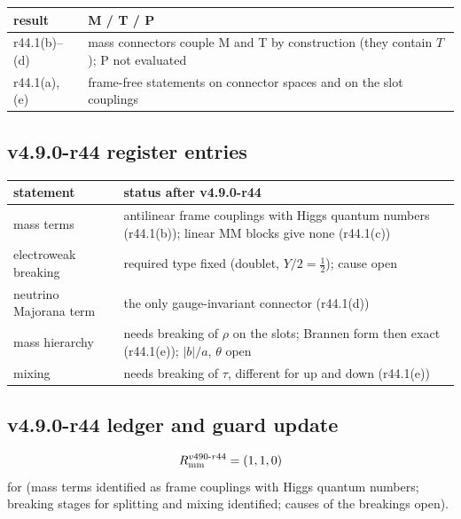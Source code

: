 \begin{center}
\small
\begin{tabular}{@{}>{\raggedright\arraybackslash}p{}>{\raggedright\arraybackslash}p{}@{}}
\toprule
result & M / T / P\\
\midrule
r44.1(b)--(d) & mass connectors couple M and T by construction (they contain \(T\)); P not evaluated\\
r44.1(a), (e) & frame-free statements on connector spaces and on the slot couplings\\
\bottomrule
\end{tabular}
\end{center}

\subsection*{v4.9.0-r44 register entries}
\label{subsec:v490-r44-register}

\begin{center}
\small
\begin{tabular}{@{}>{\raggedright\arraybackslash}p{}>{\raggedright\arraybackslash}p{}@{}}
\toprule
statement & status after v4.9.0-r44\\
\midrule
mass terms & antilinear frame couplings with Higgs quantum numbers (r44.1(b)); linear MM blocks give none (r44.1(c))\\
electroweak breaking & required type fixed (doublet, \(Y/2=\tfrac12\)); cause open\\
neutrino Majorana term & the only gauge-invariant connector (r44.1(d))\\
mass hierarchy & needs breaking of \(\rho\) on the slots; Brannen form then exact (r44.1(e)); \(|b|/a\), \(\theta\) open\\
mixing & needs breaking of \(\tau\), different for up and down (r44.1(e))\\
\bottomrule
\end{tabular}
\end{center}

\subsection*{v4.9.0-r44 ledger and guard update}
\label{subsec:v490-r44-ledger-guard}

\[
R_{\rm mm}^{v490\text{-}r44}=(1,1,0)
\]
for (mass terms identified as frame couplings with Higgs quantum numbers; breaking stages for splitting and mixing identified; causes of
the breakings open).

